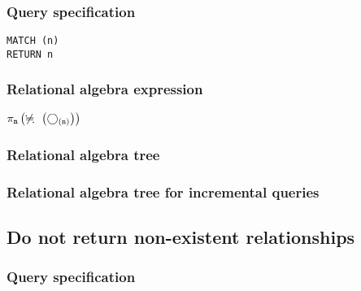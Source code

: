 \subsubsection*{Query specification}

\begin{lstlisting}
MATCH (n)
RETURN n
\end{lstlisting}

\subsubsection*{Relational algebra expression}

$\projection{\var{n}} \left(\alldifferent{} \left(\getvertices{n}{}\right)\right)$

\subsubsection*{Relational algebra tree}


\subsubsection*{Relational algebra tree for incremental queries}


\subsection{Do not return non-existent relationships}

\subsubsection*{Query specification}

